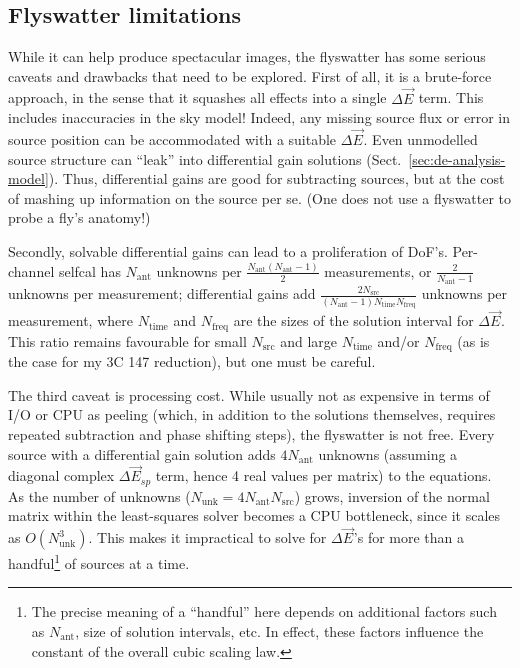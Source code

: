 \documentclass{aa}
\newcommand{\jones}[2]{\vec {#1}_{#2}}
\begin{document}
\subsection{Flyswatter limitations\label{sec:dE-limitations}}

While it can help produce spectacular images, the flyswatter has some serious caveats and drawbacks that need to be explored. First of all, it is a brute-force approach, in the sense that it squashes all effects into a single $\Delta\jones{E}{}$ term. This includes inaccuracies in the sky model! Indeed, any missing source flux or error in source position can be accommodated with a suitable $\Delta\jones{E}{}$. Even unmodelled source structure can ``leak'' into differential gain solutions (Sect.~\ref{sec:de-analysis-model}). Thus, differential gains are good for subtracting sources, but at the cost of mashing up information on the source per se. (One does not use a flyswatter to probe a fly's anatomy!)

Secondly, solvable differential gains can lead to a proliferation of DoF's. Per-channel selfcal has $N_\mathrm{ant}$ unknowns per $\frac{N_\mathrm{ant}(N_\mathrm{ant}-1)}{2}$ measurements, or $\frac{2}{N_\mathrm{ant}-1}$ unknowns per measurement; differential gains add $\frac{2N_\mathrm{src}}{(N_\mathrm{ant}-1)N_\mathrm{time}N_\mathrm{freq}}$ unknowns per measurement, where $N_\mathrm{time}$ and $N_\mathrm{freq}$ are the sizes of the solution interval for $\Delta\jones{E}{}$. This ratio remains favourable for small $N_\mathrm{src}$ and large $N_\mathrm{time}$ and/or $N_\mathrm{freq}$ (as is the case for my 3C 147 reduction), but one must be careful.

The third caveat is processing cost. While usually not as expensive in terms of I/O or CPU as peeling (which, in addition to the solutions themselves, requires repeated subtraction and phase shifting steps), the flyswatter is not free. Every source with a differential gain solution adds $4N_\mathrm{ant}$ unknowns (assuming a diagonal complex $\Delta\jones{E}{sp}$ term, hence 4 real values per matrix) to the equations. As the number of unknowns ($N_\mathrm{unk}=4N_\mathrm{ant}N_\mathrm{src}$) grows, inversion of the normal matrix within the least-squares solver becomes a CPU bottleneck, since it scales as $O(N_\mathrm{unk}^3)$. This makes it impractical to solve for $\Delta\jones{E}{}$'s for more than a handful\footnote{The precise meaning of a ``handful'' here depends on additional factors such as $N_\mathrm{ant}$, size of solution intervals, etc. In effect, these factors influence the constant of the overall cubic scaling law.} of sources at a time. 
\end{document}
